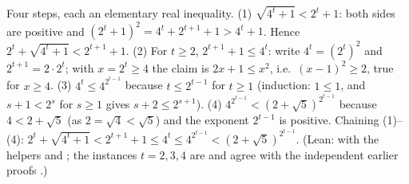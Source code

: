Four steps, each an elementary real inequality. (1) $\sqrt{4^t+1}<2^t+1$: both sides are positive and $(2^t+1)^2=4^t+2^{t+1}+1>4^t+1$. Hence $2^t+\sqrt{4^t+1}<2^{t+1}+1$. (2) For $t\ge2$, $2^{t+1}+1\le4^t$: write $4^t=(2^t)^2$ and $2^{t+1}=2\cdot2^t$; with $x=2^t\ge4$ the claim is $2x+1\le x^2$, i.e.\ $(x-1)^2\ge2$, true for $x\ge4$. (3) $4^t\le4^{2^{t-1}}$ because $t\le2^{t-1}$ for $t\ge1$ (induction: $1\le1$, and $s+1<2^s$ for $s\ge1$ gives $s+2\le2^{s+1}$). (4) $4^{2^{t-1}}<(2+\sqrt5)^{2^{t-1}}$ because $4<2+\sqrt5$ (as $2=\sqrt4<\sqrt5$) and the exponent $2^{t-1}$ is positive. Chaining (1)--(4): $2^t+\sqrt{4^t+1}<2^{t+1}+1\le4^t\le4^{2^{t-1}}<(2+\sqrt5)^{2^{t-1}}$. (Lean:  with the helpers  and ; the instances $t=2,3,4$ are  and agree with the independent earlier proofs .)
